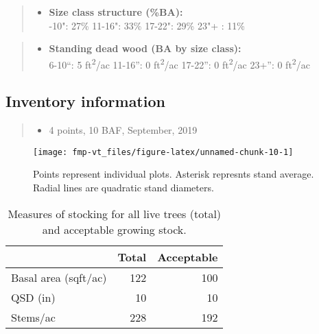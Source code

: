 \documentclass[]{tufte-handout}
\providecommand{\tightlist}{%
  \setlength{\itemsep}{0pt}\setlength{\parskip}{0pt}}
\begin{document}
\begin{quote}
\begin{itemize}
\tightlist
\item
  \textbf{Size class structure (\%BA):}\\
  \vspace{2pt} -10": 27\% \textbar{} 11-16": 33\% \textbar{}
  17-22": 29\% \textbar{} 23"+ : 11\%
\end{itemize}
\end{quote}

\begin{quote}
\begin{itemize}
\tightlist
\item
  \textbf{Standing dead wood (BA by size class):}\\
  \vspace{2pt} \indent \small 6-10``: 5 ft\textsuperscript{2}/ac
  \textbar{} 11-16'': 0 ft\textsuperscript{2}/ac \textbar{} 17-22'': 0
  ft\textsuperscript{2}/ac \textbar{} 23+'': 0 ft\textsuperscript{2}/ac
\end{itemize}
\end{quote}

\subsection{Inventory information}\label{inventory-information-1}

\begin{quote}
\begin{itemize}
\tightlist
\item
  4 points, 10 BAF, September, 2019
\end{itemize}
\end{quote}

\begin{figure}
\texttt{[image: fmp-vt\_files/figure-latex/unnamed-chunk-10-1]} \caption[Points represent individual plots]{Points represent individual plots. Asterisk represnts stand average. Radial lines are quadratic stand diameters.}\label{fig:unnamed-chunk-10}
\end{figure}

\begin{table}

\caption{\label{tab:unnamed-chunk-11}Measures of stocking for all live trees (total) and acceptable growing stock.}
\centering
\begin{tabular}[t]{lrr}
\toprule
  & Total & Acceptable\\
\midrule
Basal area (sqft/ac) & 122 & 100\\
QSD (in) & 10 & 10\\
Stems/ac & 228 & 192\\
\bottomrule
\end{tabular}
\end{table}
\end{document}

